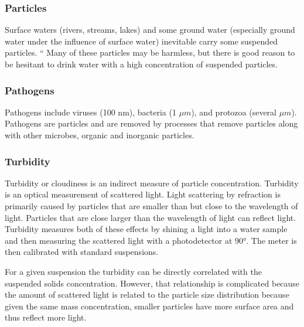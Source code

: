 \documentclass[letterpaper,10pt,english]{sphinxmanual}
\begin{document}
\subsubsection{Particles}
\label{\detokenize{Introduction/Introduction:particles}}\label{\detokenize{Introduction/Introduction:heading-particles}}
Surface waters (rivers, streams, lakes) and some ground water (especially ground water under the influence of surface water) inevitable carry some suspended particles. “ Many of these particles may be harmless, but there is good reason to be hesitant to drink water with a high concentration of suspended particles.


\subsubsection{Pathogens}
\label{\detokenize{Introduction/Introduction:pathogens}}\label{\detokenize{Introduction/Introduction:heading-pathogens}}
Pathogens include viruses (100 nm), bacteria (1 \(\mu m\)), and protozoa (several \(\mu m\)). Pathogens are particles and are removed by processes that remove particles along with other microbes, organic and inorganic particles.


\subsubsection{Turbidity}
\label{\detokenize{Introduction/Introduction:turbidity}}\label{\detokenize{Introduction/Introduction:heading-turbidity}}
Turbidity or cloudiness is an indirect measure of particle concentration. Turbidity is an optical measurement of scattered light. Light scattering by refraction is primarily caused by particles that are smaller than but close to the wavelength of light. Particles that are close larger than the wavelength of light can reflect light. Turbidity measures both of these effects by shining a light into a water sample and then measuring the scattered light with a photodetector at 90°. The meter is then calibrated with standard suspensions.

For a given suspension the turbidity can be directly correlated with the suspended solids concentration. However, that relationship is complicated because the amount of scattered light is related to the particle size distribution because given the same mass concentration, smaller particles have more surface area and thus reflect more light.
\end{document}
